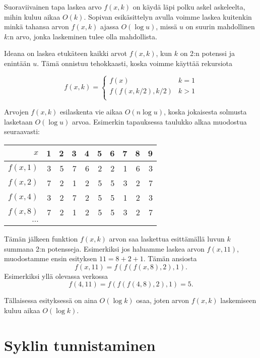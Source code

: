 Suoraviivainen tapa laskea arvo $f(x,k)$
on käydä läpi polku askel askeleelta, mihin kuluu aikaa $O(k)$.
Sopivan esikäsittelyn avulla voimme laskea kuitenkin
minkä tahansa arvon $f(x,k)$ ajassa $O(\log u)$,
missä $u$ on suurin mahdollinen $k$:n arvo,
jonka laskeminen tulee olla mahdollista.

Ideana on laskea etukäteen kaikki arvot $f(x,k)$, kun $k$ on 2:n potenssi
ja enintään $u$.
Tämä onnistuu tehokkaasti, koska voimme käyttää rekursiota

\begin{equation*}
    f(x,k) = \begin{cases}
               f(x)              & k = 1\\
               f(f(x,k/2),k/2)   & k > 1\\
           \end{cases}
\end{equation*}

Arvojen $f(x,k)$ esilaskenta vie aikaa $O(n \log u)$,
koska jokaisesta solmusta lasketaan $O(\log u)$ arvoa.
Esimerkin tapauksessa taulukko alkaa muodostua seuraavasti:

\begin{center}
\begin{tabular}{r|rrrrrrrrr}
$x$ & 1 & 2 & 3 & 4 & 5 & 6 & 7 & 8 & 9 \\
\hline
$f(x,1)$ & 3 & 5 & 7 & 6 & 2 & 2 & 1 & 6 & 3 \\
$f(x,2)$ & 7 & 2 & 1 & 2 & 5 & 5 & 3 & 2 & 7 \\
$f(x,4)$ & 3 & 2 & 7 & 2 & 5 & 5 & 1 & 2 & 3 \\
$f(x,8)$ & 7 & 2 & 1 & 2 & 5 & 5 & 3 & 2 & 7 \\
$\cdots$ \\
\end{tabular}
\end{center}

Tämän jälkeen funktion $f(x,k)$ arvon saa laskettua
esittämällä luvun $k$ summana 2:n potensseja.
Esimerkiksi jos haluamme laskea arvon $f(x,11)$,
muodostamme ensin esityksen $11=8+2+1$.
Tämän ansiosta
\[f(x,11)=f(f(f(x,8),2),1).\]
Esimerkiksi yllä olevassa verkossa 
\[f(4,11)=f(f(f(4,8),2),1)=5.\]

Tällaisessa esityksessä on aina
$O(\log k)$ osaa, joten arvon $f(x,k)$ laskemiseen
kuluu aikaa $O(\log k)$.

\section{Syklin tunnistaminen}

